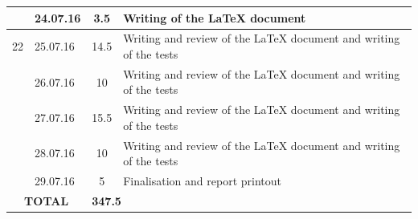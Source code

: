 \documentclass[a4paper,11pt]{report}
\begin{document}
\begin{center}
\begin{longtable}{c|l|c|p{10cm}}
     & 24.07.16 & 3.5 & Writing of the LaTeX document\\\hline
    22 & 25.07.16 & 14.5 & Writing and review of the LaTeX document and writing of the tests\\
     & 26.07.16 & 10 & Writing and review of the LaTeX document and writing of the tests\\
     & 27.07.16 & 15.5 & Writing and review of the LaTeX document and writing of the tests\\
     & 28.07.16 & 10 & Writing and review of the LaTeX document and writing of the tests\\
     & 29.07.16 & 5 & Finalisation and report printout\\\hline
     \multicolumn{2}{c|}{\textbf{TOTAL}} & \multicolumn{2}{|l}{\textbf{347.5}}\\
\end{longtable}
\end{center}
\end{document}
